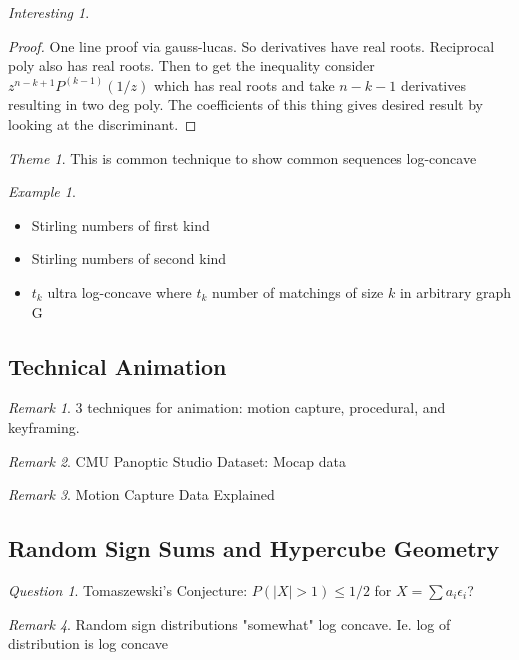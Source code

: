 \documentclass[11pt]{article}
\theoremstyle{remark}
\newtheorem{remark}{Remark}
\newtheorem{quest}{Question}
\newtheorem{interest}{Interesting}
\newtheorem{theme}{Theme}
\newtheorem{example}{Example}
\begin{document}
\begin{interest}
\begin{proof}
	One line proof via gauss-lucas. So derivatives have real roots. Reciprocal poly also has real roots. Then to get the inequality consider $z^{n-k+1}P^{(k-1)}(1/z)$ which has real roots and take $n-k-1$ derivatives resulting in two deg poly. The coefficients of this thing gives desired result by looking at the discriminant.
\end{proof}

\begin{theme}
	This is common technique to show common sequences log-concave
\end{theme}

\begin{example}
	\begin{itemize}
		\item Stirling numbers of first kind
		\item Stirling numbers of second kind
		\item $t_k$ ultra log-concave where $t_k$ number of matchings of size $k$ in arbitrary graph G
	\end{itemize}
\end{example}

\subsection{Technical Animation}

\begin{remark}
	3 techniques for animation: motion capture, procedural, and keyframing.
\end{remark}

\begin{remark}
	CMU Panoptic Studio Dataset: Mocap data
\end{remark}

\begin{remark}
	Motion Capture Data Explained
\end{remark}

\subsection{Random Sign Sums and Hypercube Geometry}

\begin{quest}
Tomaszewski's Conjecture: $P(|X| > 1) \leq 1/2$ for $X = \sum a_i \epsilon_i$?
\end{quest}

\begin{remark}
	Random sign distributions "somewhat" log concave. Ie. log of distribution is log concave
\end{remark}


\end{interest}
\end{document}
